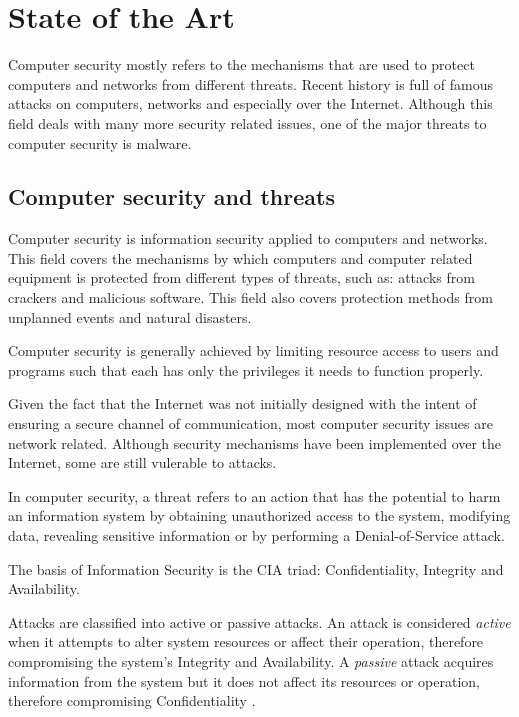 \chapter{State of the Art}
\label{chapter:second}

Computer security mostly refers to the mechanisms that are used to protect computers and networks from different threats. Recent history is full of famous attacks on computers, networks and especially over the Internet. Although this field deals with many more security related issues, one of the major threats to computer security is malware.

\section{Computer security and threats}

Computer security is information security applied to computers and networks. This field covers the mechanisms by which computers and computer related equipment is protected from different types of threats, such as: attacks from crackers and malicious software. This field also covers protection methods from unplanned events and natural disasters.

Computer security is generally achieved by limiting resource access to users and programs such that each has only the privileges it needs to function properly.

Given the fact that the Internet was not initially designed with the intent of ensuring a secure channel of communication, most computer security issues are network related. Although security mechanisms have been implemented over the Internet, some are still vulerable to attacks.

In computer security, a threat refers to an action that has the potential to harm an information system by obtaining unauthorized access to the system, modifying data, revealing sensitive information or by performing a Denial-of-Service attack.

The basis of Information Security is the CIA triad: Confidentiality, Integrity and Availability.

Attacks are classified into active or passive attacks. An attack is considered \textit{active} when it attempts to alter system resources or affect their operation, therefore compromising the system's Integrity and Availability.
A \textit{passive} attack acquires information from the system but it does not affect its resources or operation, therefore compromising Confidentiality \cite{rfc2828}.

